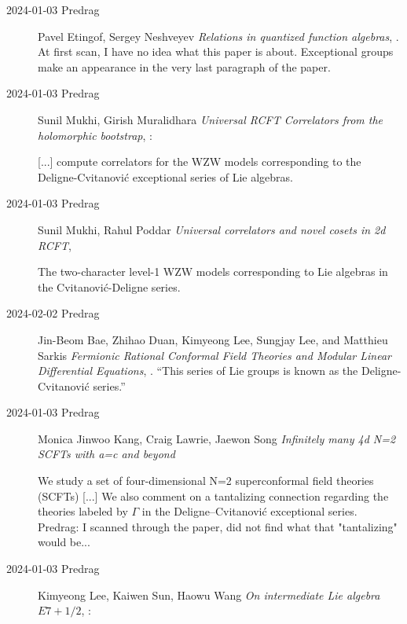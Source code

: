 \begin{description}
\item[2024-01-03 Predrag]
Pavel Etingof, Sergey Neshveyev
{\em Relations in quantized function algebras},
.
At first scan, I have no idea what this paper is about.
Exceptional groups make an appearance in the very last paragraph of the paper.


\item[2024-01-03 Predrag]
Sunil Mukhi, Girish Muralidhara
{\em Universal RCFT Correlators from the holomorphic bootstrap},
:

[...] compute
correlators for the WZW models corresponding to the
Deligne-Cvitanovi{\'c} exceptional series of Lie algebras.

\item[2024-01-03 Predrag]
Sunil Mukhi, Rahul Poddar
{\em Universal correlators and novel cosets in 2d RCFT},

The two-character level-1 WZW models corresponding to Lie algebras in the
Cvitanovi{\'c}-Deligne series.

\item[2024-02-02 Predrag]
Jin-Beom Bae, Zhihao Duan, Kimyeong Lee, Sungjay Lee, and Matthieu Sarkis
{\em Fermionic Rational Conformal Field Theories and
Modular Linear Differential Equations},
.
``This series of Lie groups is known
as the Deligne-Cvitanovi\'c series.''


\item[2024-01-03 Predrag]
Monica Jinwoo Kang, Craig Lawrie, Jaewon Song
{\em Infinitely many 4d N=2 SCFTs with a=c and beyond}

We study a set of four-dimensional N=2 superconformal field theories
(SCFTs) [...]
We also comment on a tantalizing connection regarding the theories
labeled by $\Gamma$ in the Deligne--Cvitanovi{\'c} exceptional series.
\\
Predrag: I scanned through the paper, did not find what that "tantalizing"
would be...

\item[2024-01-03 Predrag]
Kimyeong Lee, Kaiwen Sun, Haowu Wang
{\em On intermediate Lie algebra $E7+1/2$},
:


\end{description}
